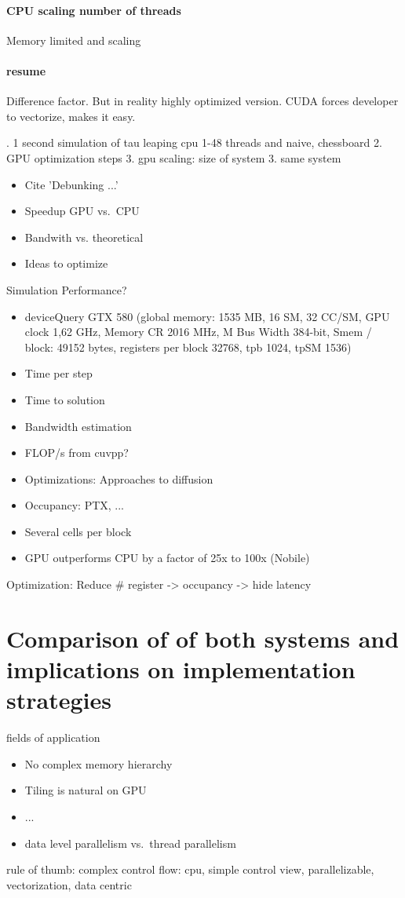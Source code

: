 \paragraph{CPU scaling number of threads} Memory limited and scaling

\paragraph{resume} Difference factor. But in reality highly optimized version. CUDA forces developer to vectorize, makes it easy. 

. 1 second simulation of tau leaping cpu 1-48 threads and naive, chessboard
2. GPU optimization steps
3. gpu scaling: size of system
3. same system



\begin{itemize}
\item Cite 'Debunking ...'
\item Speedup GPU vs.\ CPU
\item Bandwith vs. theoretical
\item Ideas to optimize
\end{itemize}
Simulation Performance?
\begin{itemize}
\item deviceQuery GTX 580 (global memory: 1535 MB, 16 SM, 32 CC/SM, GPU clock 1,62 GHz, Memory CR 2016 MHz, M Bus Width 384-bit, Smem / block: 49152 bytes, registers per block 32768, tpb 1024, tpSM 1536)
\item Time per step
\item Time to solution
\item Bandwidth estimation
\item FLOP/s from cuvpp?
\item Optimizations: Approaches to diffusion
\item Occupancy: PTX, ...
\item Several cells per block
\item GPU outperforms CPU by a factor of 25x to 100x (Nobile)
\end{itemize}

\ifdebug
Optimization: Reduce # register -> occupancy -> hide latency
\fi

\ifdebug
\section{Comparison of of both systems and implications on implementation strategies}
fields of application

\begin{itemize}
\item No complex memory hierarchy
\item Tiling is natural on GPU
\item ...
\item data level parallelism vs.\ thread parallelism
\end{itemize}
rule of thumb: complex control flow: cpu, simple control view, parallelizable, vectorization, data centric
\fi
\fi